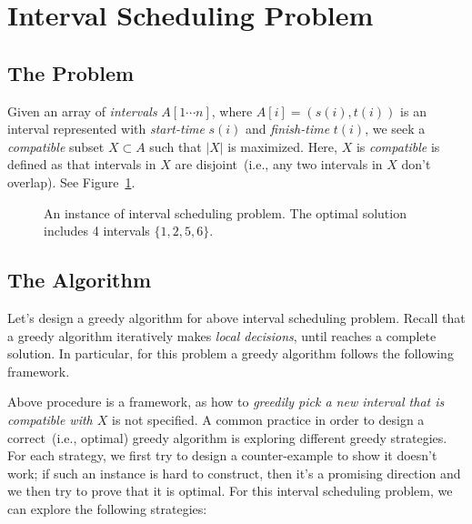 \setcounter{definition}{0} \setcounter{property}{0} \setcounter{claim}{0} \setcounter{fact}{0} \setcounter{corollary}{0} \setcounter{figure}{0}
\section{Interval Scheduling Problem}

\subsection*{The Problem}

Given an array of \emph{intervals} $A[1\cdots n]$, where $A[i] = (s(i),t(i))$ is an interval represented with
\emph{start-time} $s(i)$ and \emph{finish-time} $t(i)$, we seek a \emph{compatible} subset $X\subset A$
such that $|X|$ is maximized. Here, $X$ is \emph{compatible} is defined as that intervals in $X$
are disjoint~(i.e., any two intervals in $X$ don't overlap).
See Figure~\ref{fig:interval}.

\begin{figure}[h]
\centering{}
\caption{An instance of interval scheduling problem.
The optimal solution includes 4 intervals $\{1, 2, 5, 6\}$.}
\label{fig:interval}
\end{figure}

\subsection*{The Algorithm}

Let's design a greedy algorithm for above interval scheduling problem.
Recall that a greedy algorithm iteratively makes \emph{local decisions},
until reaches a complete solution. In particular, for this problem
a greedy algorithm follows the following framework.

\begin{minipage}{0.8\textwidth}
	\xxx
	\xxx
	\xxx
	\xxx
	\xxx
	\xxx
	\xxx
\end{minipage}

Above procedure is a framework, as how to \emph{greedily pick a new interval that is compatible with $X$} is not specified.
A common practice in order to design a correct~(i.e., optimal) greedy algorithm is
exploring different greedy strategies. For each strategy, we first try to
design a counter-example to show it doesn't work; if such an instance
is hard to construct, then it's a promising direction and we then try to prove that it is optimal.
For this interval scheduling problem, we can explore the following strategies:

